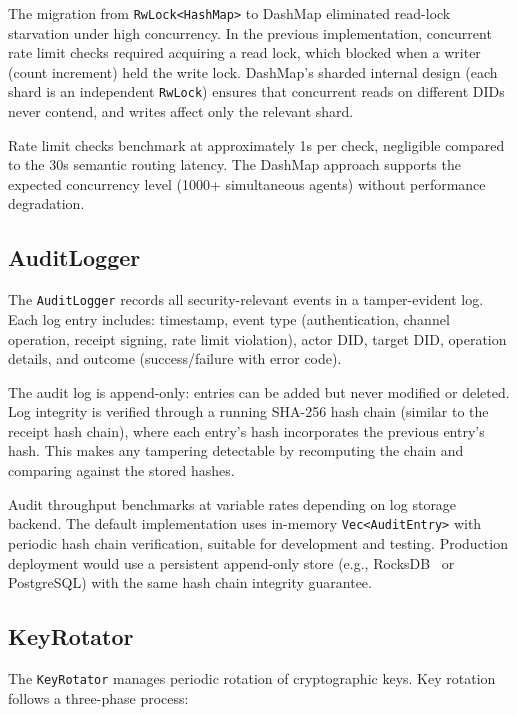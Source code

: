 The migration from \texttt{RwLock<HashMap>} to DashMap eliminated read-lock starvation under high concurrency. In the previous implementation, concurrent rate limit checks required acquiring a read lock, which blocked when a writer (count increment) held the write lock. DashMap's sharded internal design (each shard is an independent \texttt{RwLock}) ensures that concurrent reads on different DIDs never contend, and writes affect only the relevant shard.

Rate limit checks benchmark at approximately 1\textmu s per check, negligible compared to the 30\textmu s semantic routing latency. The DashMap approach supports the expected concurrency level (1000+ simultaneous agents) without performance degradation.

\subsection{AuditLogger}

The \texttt{AuditLogger} records all security-relevant events in a tamper-evident log. Each log entry includes: timestamp, event type (authentication, channel operation, receipt signing, rate limit violation), actor DID, target DID, operation details, and outcome (success/failure with error code).

The audit log is append-only: entries can be added but never modified or deleted. Log integrity is verified through a running SHA-256 hash chain (similar to the receipt hash chain), where each entry's hash incorporates the previous entry's hash. This makes any tampering detectable by recomputing the chain and comparing against the stored hashes.

Audit throughput benchmarks at variable rates depending on log storage backend. The default implementation uses in-memory \texttt{Vec<AuditEntry>} with periodic hash chain verification, suitable for development and testing. Production deployment would use a persistent append-only store (e.g., RocksDB~\cite{rocksdb2014} or PostgreSQL) with the same hash chain integrity guarantee.

\subsection{KeyRotator}

The \texttt{KeyRotator} manages periodic rotation of cryptographic keys. Key rotation follows a three-phase process:

